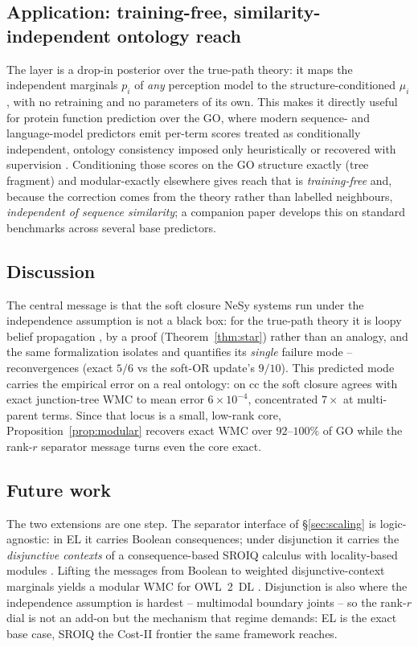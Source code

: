 \documentclass[anon]{nesy2026}
\begin{document}
\subsection{Application: training-free, similarity-independent ontology reach}
The layer is a drop-in posterior over the true-path theory: it maps the independent marginals
$p_i$ of \emph{any} perception model to the structure-conditioned $\mu_i$, with no retraining and
no parameters of its own. This makes it directly useful for protein function prediction over the
GO, where modern sequence- and language-model predictors
\citep{kulmanov2020deepgoplus,lin2023esm2,yu2023clean} emit per-term scores treated as conditionally
independent, ontology consistency imposed only heuristically or recovered with supervision
\citep{kulmanov2018deepgo,kulmanov2022deepgozero}. Conditioning those scores on the GO structure
exactly (tree fragment) and modular-exactly elsewhere gives reach that is \emph{training-free} and,
because the correction comes from the theory rather than labelled neighbours, \emph{independent of
sequence similarity}; a companion paper develops this on standard benchmarks
\citep{radivojac2013cafa,zhou2019cafa3} across several base predictors.

\subsection{Discussion}
The central message is that the soft closure NeSy systems run under the independence assumption
\citep{vankrieken2024independence} is not a black box: for the true-path theory it is loopy belief
propagation \citep{pearl1988probabilistic}, by a proof (Theorem~\ref{thm:star}) rather than an analogy, and the same formalization isolates and quantifies its
\emph{single} failure mode -- reconvergences (exact $5/6$ vs the soft-OR update's $9/10$). This predicted mode carries the
empirical error on a real ontology: on cc the soft closure agrees with exact junction-tree WMC to mean
error $6\times10^{-4}$, concentrated $7\times$ at multi-parent terms. Since that locus is a small,
low-rank core, Proposition~\ref{prop:modular} recovers exact WMC over $92$--$100\%$ of GO while the
rank-$r$ separator message turns even the core exact.

\subsection{Future work}
The two extensions are one step. The separator interface of \S\ref{sec:scaling} is logic-agnostic: in
EL it carries Boolean consequences; under disjunction it carries the \emph{disjunctive contexts} of a
consequence-based SROIQ calculus \citep{bate2016sriq,tenacucala2019sequoia} with locality-based
modules \citep{cuencagrau2008modular,delvescovo2011atomic}. Lifting the messages from Boolean to
weighted disjunctive-context marginals yields a modular WMC for OWL~2~DL
\citep{horrocks2006sroiq,motik2009hypertableau}. Disjunction is also where the independence assumption
is hardest -- multimodal boundary joints -- so the rank-$r$ dial is not an add-on but the mechanism that
regime demands: EL is the exact base case, SROIQ the Cost-II frontier the same framework
reaches.
\end{document}
